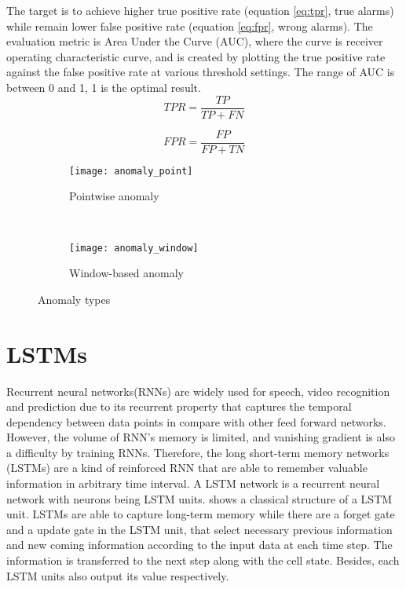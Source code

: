The target is to achieve higher true positive rate (equation \ref{eq:tpr}, true alarms) while remain lower false positive rate (equation \ref{eq:fpr}, wrong alarms). The evaluation metric is Area Under the Curve (AUC), where the curve is receiver operating characteristic curve, and is created by plotting the true positive rate against the false positive rate at various threshold settings. The range of AUC is between 0 and 1, 1 is the optimal result.\\
\begin{equation} \label{eq:tpr}
TPR =\dfrac{TP}{TP+FN}
\end{equation}

\begin{equation} \label{eq:fpr}
FPR = \dfrac{FP}{FP+TN}
\end{equation}
\begin{figure}[h]
\centering
	\begin {subfigure}[t]{8cm}
	\centering
	\texttt{[image: anomaly\_point]}
	\caption{Pointwise anomaly}
	\label{fig:point}
	\end{subfigure}
	~
	\begin {subfigure}[t]{8cm}
	\centering
	\texttt{[image: anomaly\_window]}
	\caption{Window-based anomaly}
	\label{fig:window}
	\end{subfigure}
	\caption[Anomaly types]{Anomaly types}
\label{fig:anomalytypes}

\end{figure}


\section{LSTMs}
\label{sec:LSTMs}

Recurrent neural networks(RNNs) are widely used for speech, video recognition and prediction due to its recurrent property that captures the temporal dependency between data points in compare with other feed forward networks. However, the volume of RNN’s memory is limited, and vanishing gradient is also a difficulty by training RNNs. Therefore, the long short-term memory networks (LSTMs) are a kind of reinforced RNN that are able to remember valuable information in arbitrary time interval. A LSTM network is a recurrent neural network with neurons being LSTM units.  shows a classical structure of a LSTM unit. LSTMs are able to capture long-term memory while there are a forget gate and a update gate in the LSTM unit, that select necessary previous information and new coming information according to the input data at each time step. The information is transferred to the next step along with the cell state. Besides, each LSTM units also output its value respectively.\\

